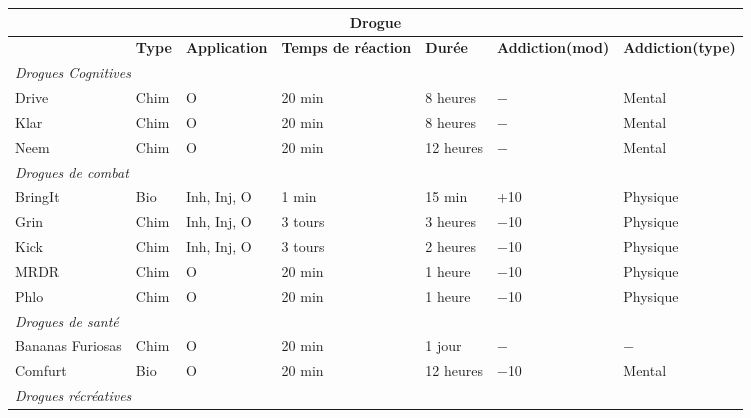\begin{table} \begin{tabularx}{\textwidth}{|X|l|l|l|l|X|X|} \hline

\multicolumn{7}{|c|}{\textbf{Drogue}}	\\ \hline

&\textbf{Type}	&\textbf{Application}	&\textbf{Temps de réaction}	&\textbf{Durée}	&\textbf{Addiction\newline (mod)}	&\textbf{Addiction\newline (type)} \\ \hline

\multicolumn{7}{|l|}{\emph{Drogues Cognitives}}	\\ \hline

Drive	&Chim	&O	&20 min &8 heures	&$-$	&Mental	\\ \hline

Klar	&Chim	&O	&20 min	&8 heures	&$-$	&Mental	\\ \hline

Neem	&Chim	&O	&20 min	&12 heures	&$-$	&Mental	\\ \hline

\multicolumn{7}{|l|}{\emph{Drogues de combat}}	\\ \hline

BringIt	&Bio	&Inh, Inj, O	&1 min	&15 min	&+10	&Physique	\\ \hline

Grin	&Chim	&Inh, Inj, O	&3 tours	&3 heures	&$-$10	&Physique	\\ \hline

Kick	&Chim	&Inh, Inj, O	&3 tours	&2 heures	&$-$10	&Physique	\\ \hline

MRDR	&Chim	&O	&20 min	&1 heure	&$-$10	&Physique	\\ \hline

Phlo	&Chim	&O	&20 min	&1 heure	&$-$10	&Physique	\\ \hline

\multicolumn{7}{|l|}{\emph{Drogues de santé}}	\\ \hline

Bananas Furiosas	&Chim	&O	&20 min	&1 jour	&$-$	&$-$	\\ \hline

Comfurt	&Bio	&O	&20 min	&12 heures	&$-$10	&Mental	\\ \hline

\multicolumn{7}{|l|}{\emph{Drogues récréatives}}	\\ \hline


\end{tabularx}
\end{table}
